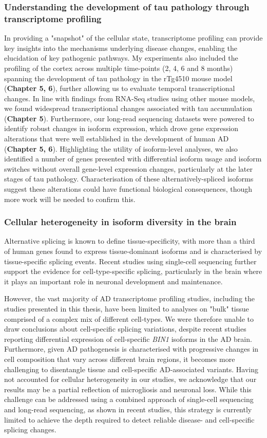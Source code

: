 \subsubsection{Understanding the development of tau pathology through transcriptome profiling}
In providing a "snapshot" of the cellular state, transcriptome profiling can provide key insights into the mechanisms underlying disease changes, enabling the elucidation of key pathogenic pathways. My experiments also included the profiling of the cortex across multiple time-points (2, 4, 6 and 8 months) spanning the development of tau pathology in the rTg4510 mouse model (\textbf{Chapter 5, 6}), further allowing us to evaluate temporal transcriptional changes. In line with findings from RNA-Seq studies using other mouse models, we found widespread transcriptional changes associated with tau accumulation (\textbf{Chapter 5}). Furthermore, our long-read sequencing datasets were powered to identify robust changes in isoform expression, which drove gene expression alterations that were well established in the development of human AD (\textbf{Chapter 5, 6}). Highlighting the utility of isoform-level analyses, we also identified a number of genes presented with differential isoform usage and isoform switches without overall gene-level expression changes, particularly at the later stages of tau pathology. Characterisation of these alternatively-spliced isoforms suggest these alterations could have functional biological consequences, though more work will be needed to confirm this.   

\subsubsection{Cellular heterogeneity in isoform diversity in the brain}
Alternative splicing is known to define tissue-specificity, with more than a third of human genes found to express tissue-dominant isoforms and is characterised by tissue-specific splicing events. Recent studies using single-cell sequencing further support the evidence for cell-type-specific splicing, particularly in the brain where it plays an important role in neuronal development and maintenance.

However, the vast majority of AD transcriptome profiling studies, including the studies presented in this thesis, have been limited to analyses on "bulk" tissue comprised of a complex mix of different cell-types. We were therefore unable to draw conclusions about cell-specific splicing variations, despite recent studies reporting differential expression of cell-specific \textit{BIN1} isoforms in the AD brain. Furthermore, given AD pathogenesis is characterised with progressive changes in cell composition that vary across different brain regions, it becomes more challenging to disentangle tissue and cell-specific AD-associated variants. Having not accounted for cellular heterogeneity in our studies, we acknowledge that our results may be a partial reflection of microgliosis and neuronal loss. While this challenge can be addressed using a combined approach of single-cell sequencing and long-read sequencing, as shown in recent studies, this strategy is currently limited to achieve the depth required to detect reliable disease- and cell-specific splicing changes. 
 
